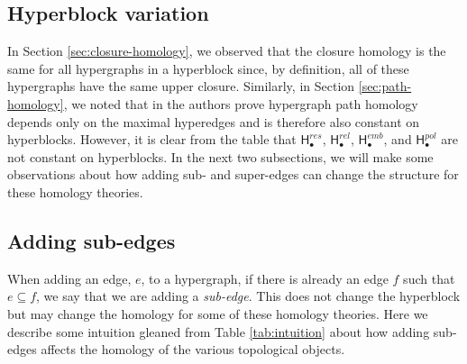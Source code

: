 \documentclass{amsart}
\newcommand{\Hgroup}	     {\mathsf{H}}
\renewcommand{\hom}[2]{\Hgroup_{#2}^{#1}}
\begin{document}
\subsection{Hyperblock variation}
In Section \ref{sec:closure-homology}, we observed that the closure homology is the same for all hypergraphs in a hyperblock since, by definition, all of these hypergraphs have the same upper closure.
Similarly, in Section \ref{sec:path-homology}, we noted that in \cite[Proposition 5.6]{GrigoryanJimenezMuranov2019} the authors prove hypergraph path homology depends only on the maximal hyperedges and is therefore also constant on hyperblocks.
However, it is clear from the table that $\hom{res}{\bullet}$, $\hom{rel}{\bullet}$, $\hom{emb}{\bullet}$, and $\hom{pol}{\bullet}$ are not constant on hyperblocks. In the next two subsections, we will make some observations about how adding sub- and super-edges can change the structure for these homology theories.

\subsection{Adding sub-edges}
When adding an edge, $e$, to a hypergraph, if there is already an edge $f$ such that $e \subseteq f$, we say that we are adding a \emph{sub-edge}. This does not change the hyperblock but may change the homology for some of these homology theories. Here we describe some intuition gleaned from Table \ref{tab:intuition} about how adding sub-edges affects the homology of the various topological objects.
\\
\end{document}
